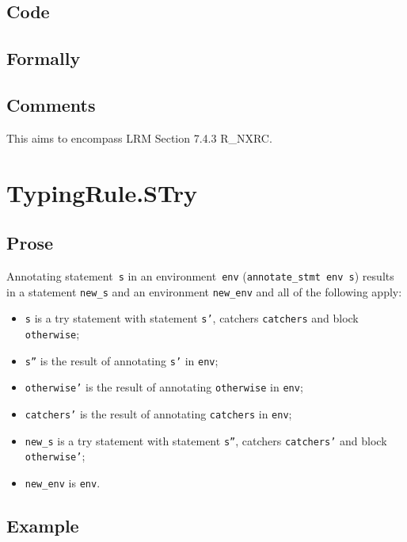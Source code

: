 \documentclass{book}
\begin{document}
  \subsection{Code}

\begin{emptyformal}
    \subsection{Formally}
\end{emptyformal}

\subsection{Comments}
    This aims to encompass LRM Section 7.4.3 R\_NXRC.


\section{TypingRule.STry \label{sec:TypingRule.STry}}

  \subsection{Prose}
Annotating statement~\texttt{s} in an environment~\texttt{env}
(\texttt{annotate\_stmt env s}) results in a statement \texttt{new\_s} and an
environment \texttt{new\_env} and all of the following apply:
   \begin{itemize}
   \item \texttt{s} is a try statement with statement \texttt{s'}, catchers \texttt{catchers} and block \texttt{otherwise};
   \item \texttt{s''} is the result of annotating \texttt{s'} in \texttt{env};
   \item \texttt{otherwise'} is the result of annotating \texttt{otherwise} in \texttt{env};
   \item \texttt{catchers'} is the result of annotating \texttt{catchers} in \texttt{env};
   \item \texttt{new\_s} is a try statement with statement \texttt{s''}, catchers \texttt{catchers'} and block \texttt{otherwise'};
   \item \texttt{new\_env} is \texttt{env}.
   \end{itemize}

  \subsection{Example}
\end{document}
